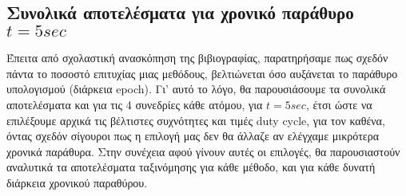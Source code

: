 \documentclass[11pt,a4paper,english,greek,twoside]{../Thesis}
\begin{document}
\subsection{Συνολικά αποτελέσματα για χρονικό παράθυρο $t=5sec$}

\par Έπειτα από σχολαστική ανασκόπηση της βιβιογραφίας, παρατηρήσαμε πως σχεδόν πάντα το ποσοστό επιτυχίας μιας μεθόδους, βελτιώνεται όσο αυξάνεται το παράθυρο υπολογισμού (διάρκεια epoch). Γι' αυτό το λόγο, θα παρουσιάσουμε τα συνολικά αποτελέσματα και για τις 4 συνεδρίες κάθε ατόμου, για $t=5sec$, έτσι ώστε να επιλέξουμε αρχικά τις βέλτιστες συχνότητες και τιμές duty cycle, για τον καθένα, όντας σχεδόν σίγουροι πως η επιλογή μας δεν θα άλλαζε αν ελέγχαμε μικρότερα χρονικά παράθυρα. Στην συνέχεια αφού γίνουν αυτές οι επιλογές, θα παρουσιαστούν αναλυτικά τα αποτελέσματα ταξινόμησης για κάθε μέθοδο, και για κάθε δυνατή διάρκεια χρονικού παραθύρου.
\end{document}
